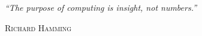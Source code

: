\begin{titlingpage*}

\null
\vfill

\begin{flushright}
{\huge \emph{``The purpose of computing is insight, not numbers.''}}\\

\vspace{10pt}

{\LARGE \scshape Richard Hamming}
\end{flushright}

\vfill
\end{titlingpage*}
